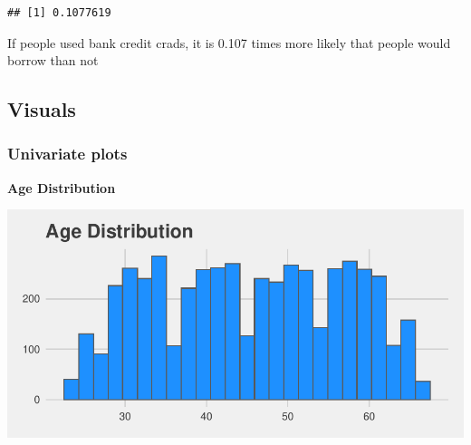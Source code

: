 \documentclass[
]{article}
\newenvironment{Shaded}{\begin{snugshade}}{\end{snugshade}}
\newcommand{\CommentTok}[1]{\textcolor[rgb]{0.00,0.40,1.00}{\textbf{\textit{#1}}}}
\newcommand{\DataTypeTok}[1]{\textcolor[rgb]{0.74,0.68,0.62}{\underline{#1}}}
\newcommand{\FloatTok}[1]{\textcolor[rgb]{0.27,0.67,0.26}{#1}}
\newcommand{\KeywordTok}[1]{\textcolor[rgb]{0.26,0.66,0.93}{\textbf{#1}}}
\newcommand{\NormalTok}[1]{\textcolor[rgb]{0.74,0.68,0.62}{#1}}
\newcommand{\OperatorTok}[1]{\textcolor[rgb]{0.74,0.68,0.62}{#1}}
\newcommand{\StringTok}[1]{\textcolor[rgb]{0.02,0.61,0.04}{#1}}
\begin{document}
\begin{verbatim}
## [1] 0.1077619
\end{verbatim}

If people used bank credit crads, it is 0.107 times more likely that
people would borrow than not

\pagebreak

\hypertarget{visuals}{%
\subsection{Visuals}\label{visuals}}

\hypertarget{univariate-plots}{%
\subsubsection{Univariate plots}\label{univariate-plots}}

\textbf{Age Distribution}

\begin{Shaded}
\end{Shaded}

\includegraphics{Bank_Loan_Classification_files/figure-latex/unnamed-chunk-8-1.pdf}
\end{document}
